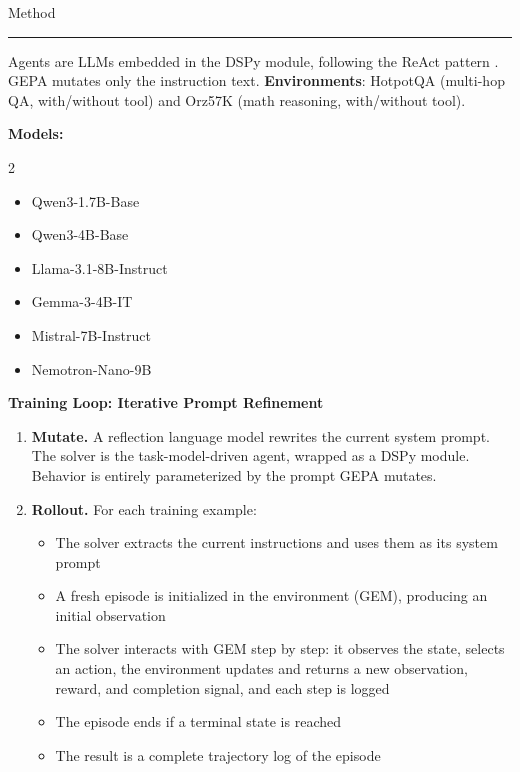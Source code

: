 \documentclass[final]{beamer}
\newcommand{\blockrule}{\vspace{-1.5em}\textcolor{harvardcrimson}{\rule{\linewidth}{1.2pt}}\vspace{-0.2em}}
\newlength{\colwidth}
\begin{document}
\begin{frame}[t]
\begin{columns}[t]
\begin{column}{\colwidth}
  \begin{block}{Method}
  \blockrule
  
    Agents are LLMs embedded in the DSPy module, following the ReAct pattern \cite{react2023}. GEPA mutates only the instruction text. \textbf{Environments}: HotpotQA (multi-hop QA, with/without tool) and Orz57K (math reasoning, with/without tool).

    \textbf{Models:}
        \vspace{-0.5em}
        \begin{multicols}{2}
        \begin{itemize}
            \item Qwen3-1.7B-Base
            \item Qwen3-4B-Base
            \item Llama-3.1-8B-Instruct
            \item Gemma-3-4B-IT
            \item Mistral-7B-Instruct
            \item Nemotron-Nano-9B
        \end{itemize}
        \end{multicols}

\textbf{Training Loop: Iterative Prompt Refinement}

\begin{enumerate}
    \item \textbf{Mutate.} A reflection language model rewrites the current system prompt. The solver is the task-model-driven agent, wrapped as a DSPy module. Behavior is entirely parameterized by the prompt GEPA mutates.

    \item \textbf{Rollout.} For each training example:
    \begin{itemize}
        \item The solver extracts the current instructions and uses them as its system prompt
        \item A fresh episode is initialized in the environment (GEM), producing an initial observation
        \item The solver interacts with GEM step by step: it observes the state, selects an action, the environment updates and returns a new observation, reward, and completion signal, and each step is logged
        \item The episode ends if a terminal state is reached
        \item The result is a complete trajectory log of the episode
    \end{itemize}


\end{enumerate}
\end{block}
\end{column}
\end{columns}
\end{frame}
\end{document}
